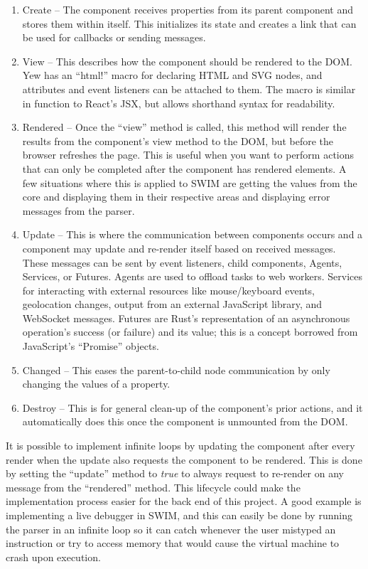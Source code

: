 \documentclass[
    paper=letter,
    parskip=half,
    fontsize=12pt,
    titlepage=firstiscover,
    toc=bibliography,
    numbers=endperiod
]{scrartcl}
\providecommand{\tightlist}{%
  \setlength{\itemsep}{0pt}\setlength{\parskip}{0pt}}
\begin{document}
\begin{enumerate}
    \tightlist
    \item Create -- The component receives properties from its parent component
    and stores them within itself. This initializes its state and creates
    a link that can be used for callbacks or sending messages.
    \item View -- This describes how the component should be rendered to the
    DOM. Yew has an ``html!'' macro for declaring HTML and SVG nodes, and
    attributes and event listeners can be attached to them. The macro is
    similar in function to React's JSX, but allows shorthand syntax for
    readability.
    \item Rendered -- Once the ``view'' method is called, this method will render the results from the component's view method to
    the DOM, but before the browser refreshes the page. This is useful
    when you want to perform actions that can only be completed after the
    component has rendered elements. A few situations where this is applied to SWIM are getting the values
    from the core and displaying them in their respective areas and displaying error messages from the parser.
    \item Update -- This is where the communication between components occurs
    and a component may update and re-render itself based on received
    messages. These messages can be sent by event listeners, child
    components, Agents, Services, or Futures. Agents are used to offload tasks to
    web workers. Services for interacting with external resources like mouse/keyboard events, geolocation changes,
    output from an external JavaScript library, and WebSocket messages. Futures are Rust's representation of an
    asynchronous operation's success (or failure) and its value;
    this is a concept borrowed from JavaScript's ``Promise'' objects.
    \item Changed -- This eases the parent-to-child node communication by only
    changing the values of a property.
    \item Destroy -- This is for general clean-up of the component's prior
    actions, and it automatically does this once the component is
    unmounted from the DOM.
\end{enumerate}

It is possible to implement infinite loops by updating the component
after every render when the update also requests the component to be
rendered. This is done by setting the ``update'' method to {\em true} to always request
to re-render on any message from the ``rendered'' method. This lifecycle could make the implementation process easier
for the back end of this project. A good example is implementing a live
debugger in SWIM, and this can easily be done by running the parser
in an infinite loop so it can catch whenever the user mistyped an
instruction or try to access memory that would cause the virtual machine
to crash upon execution.
\end{document}
